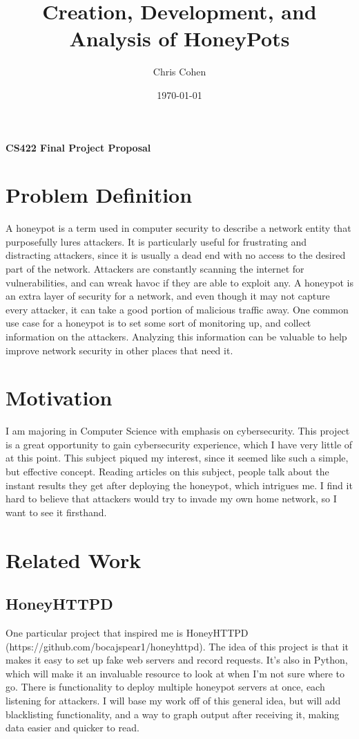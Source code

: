 \documentclass[12pt]{article}
\author{Chris Cohen}
\title{Creation, Development, and Analysis of HoneyPots}
\date{\today}
\renewcommand\maketitle{
	\begin{flushleft}
	\textbf{\theauthor}

	\textbf{\thedate}

	\textbf{CS422 Final Project Proposal}
	\end{flushleft}

	\begin{center}
	\Large{\textbf{\thetitle}}
	\end{center}
}
\begin{document}
\maketitle
\section{Problem Definition}


A honeypot is a term used in computer security to describe a network entity that purposefully lures attackers.
It is particularly useful for frustrating and distracting attackers, since it is usually a dead end with no access to the desired part of the network.
Attackers are constantly scanning the internet for vulnerabilities, and can wreak havoc if they are able to exploit any.
A honeypot is an extra layer of security for a network, and even though it may not capture every attacker, it can take a good portion of malicious traffic away.
One common use case for a honeypot is to set some sort of monitoring up, and collect information on the attackers.
Analyzing this information can be valuable to help improve network security in other places that need it.

\section{Motivation}
I am majoring in Computer Science with emphasis on cybersecurity.
This project is a great opportunity to gain cybersecurity experience, which I have very little of at this point.
This subject piqued my interest, since it seemed like such a simple, but effective concept.
Reading articles on this subject, people talk about the instant results they get after deploying the honeypot, which intrigues me.
I find it hard to believe that attackers would try to invade my own home network, so I want to see it firsthand.

\section{Related Work}
\subsection{HoneyHTTPD}
One particular project that inspired me is HoneyHTTPD (https://github.com/bocajspear1/honeyhttpd).
The idea of this project is that it makes it easy to set up fake web servers and record requests.
It's also in Python, which will make it an invaluable resource to look at when I'm not sure where to go.
There is functionality to deploy multiple honeypot servers at once, each listening for attackers.
I will base my work off of this general idea, but will add blacklisting functionality, and a way to graph output after receiving it, making data easier and quicker to read.
\end{document}
